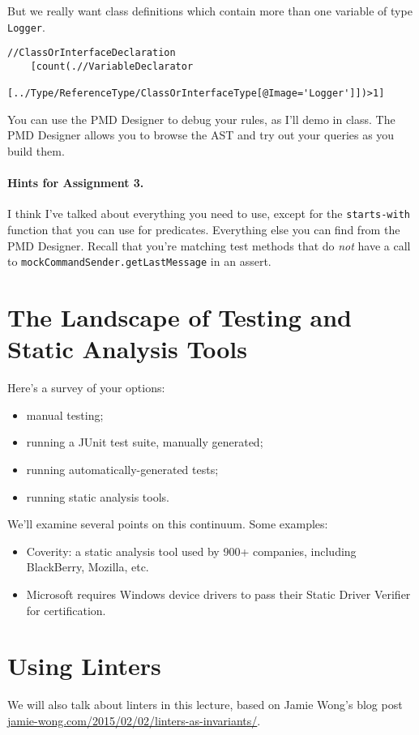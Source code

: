 \documentclass[11pt]{article}
\begin{document}
But we really want class definitions which contain more than one 
variable of type {\tt Logger}. 
\noindent
{\small \begin{verbatim}
//ClassOrInterfaceDeclaration
    [count(.//VariableDeclarator
      [../Type/ReferenceType/ClassOrInterfaceType[@Image='Logger']])>1]
\end{verbatim}

You can use the PMD Designer to debug your rules, as I'll demo in class. The PMD Designer allows you to browse the AST and try out your queries as you build them.

\paragraph{Hints for Assignment 3.} I think I've talked about everything you need to use, except for the {\tt starts-with} function that you can use for predicates. Everything else you can find from the PMD Designer. Recall that you're matching test methods that do \emph{not} have a call to {\tt mockCommandSender.getLastMessage} in an assert.

\section*{The Landscape of Testing and Static Analysis Tools}
Here's a survey of your options:
\begin{itemize}[noitemsep]
    \item manual testing;
    \item running a JUnit test suite, manually generated;
    \item running automatically-generated tests;
    \item running static analysis tools.
\end{itemize}
We'll examine several points on this continuum.
Some examples:
\begin{itemize}[noitemsep]
    \item Coverity: a static analysis tool used by 900+ companies, 
      including BlackBerry, Mozilla, etc.
    \item Microsoft requires Windows device drivers 
      to pass their Static Driver Verifier for certification.
\end{itemize}

\section*{Using Linters}
We will also talk about linters in this lecture, based on Jamie Wong's blog post \url{jamie-wong.com/2015/02/02/linters-as-invariants/}.

}
\end{document}
